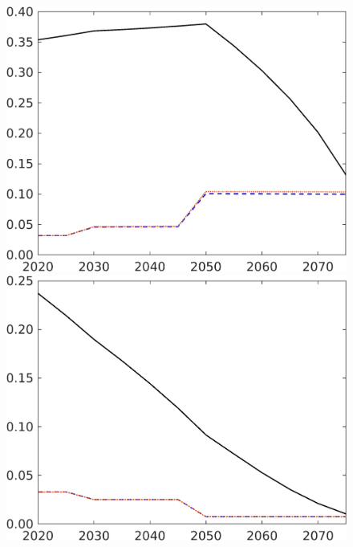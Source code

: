\begin{figure}[h!!]
\begin{minipage}[]{0.32\textwidth}
\end{minipage}
\begin{minipage}[]{0.32\textwidth}
	\includegraphics[width=1\textwidth]{../../codding_model/own_basedOnFried/optimalPol_elastS_DisuSci/figures/all_1705/sg_CompEffOPT_T_NoTaus_spillover0_sep1_BN0_ineq0_etaa0.79_lgd0.png}
\end{minipage}
\begin{minipage}[]{0.32\textwidth}
	\includegraphics[width=1\textwidth]{../../codding_model/own_basedOnFried/optimalPol_elastS_DisuSci/figures/all_1705/sff_CompEffOPT_T_NoTaus_spillover0_sep1_BN0_ineq0_etaa0.79_lgd0.png}

\end{minipage}
\end{figure}
